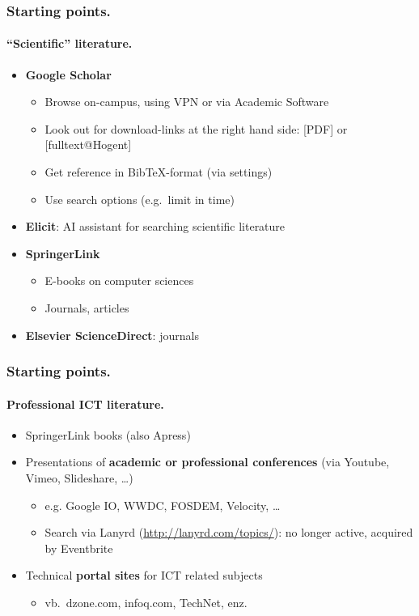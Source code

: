 \documentclass[aspectratio=169]{beamer}
\begin{document}
\begin{frame}
    \frametitle{Starting points.}
    \framesubtitle{``Scientific'' literature.}

    \begin{itemize}
        \item<+-> \textbf{Google Scholar}
            \begin{itemize}
                \item Browse on-campus, using VPN or via Academic Software
                \item Look out for download-links at the right hand side: [PDF] or [fulltext@Hogent]
                \item Get reference in Bib{\TeX}-format (via settings)
                \item Use search options (e.g.~limit in time)
            \end{itemize}
        \item<+-> \textbf{Elicit}: AI assistant for searching scientific literature
        \item<+-> \textbf{SpringerLink}
            \begin{itemize}
                \item E-books on computer sciences
                \item Journals, articles
            \end{itemize}
        \item<+-> \textbf{Elsevier ScienceDirect}: journals
    \end{itemize}
\end{frame}

\begin{frame}
    \frametitle{Starting points.}
    \framesubtitle{Professional ICT literature.}

    \begin{itemize}
        \item SpringerLink books (also Apress)
        \item Presentations of \textbf{academic or professional conferences} (via Youtube, Vimeo, Slideshare, \dots)
              \begin{itemize}
                  \item e.g. Google IO, WWDC, FOSDEM, Velocity, \dots
                  \item Search via Lanyrd (\url{http://lanyrd.com/topics/}): no longer active, acquired by Eventbrite
              \end{itemize}
        \item<+-> Technical \textbf{portal sites} for ICT related subjects
            \begin{itemize}
                \item vb.~dzone.com, infoq.com, TechNet, enz.
            \end{itemize}
    \end{itemize}
\end{frame}
\end{document}

